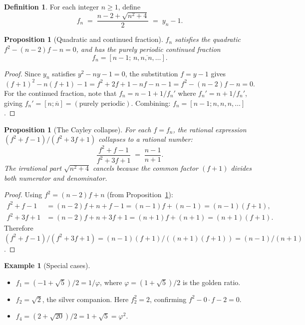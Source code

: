 \documentclass[11pt]{amsart}
\newtheorem{proposition}[theorem]{Proposition}
\theoremstyle{definition}
\newtheorem{definition}[theorem]{Definition}
\newtheorem{example}[theorem]{Example}
\begin{document}
\begin{definition}\label{def:fn}
For each integer $n \geq 1$, define
\[
f_n \;=\; \frac{n - 2 + \sqrt{n^2 + 4}}{2} \;=\; y_n - 1.
\]
\end{definition}

\begin{proposition}[Quadratic and continued fraction]\label{prop:fn-quad}
$f_n$ satisfies the quadratic $f^2 - (n-2)f - n = 0$, and has the purely periodic continued fraction
\[
f_n = [n-1;\, \overline{n, n, n, \ldots}].
\]
\end{proposition}

\begin{proof}
Since $y_n$ satisfies $y^2 - ny - 1 = 0$, the substitution $f = y - 1$ gives
\[
(f+1)^2 - n(f+1) - 1 = f^2 + 2f + 1 - nf - n - 1 = f^2 - (n-2)f - n = 0.
\]
For the continued fraction, note that $f_n = n - 1 + 1/f_n'$ where $f_n' = n + 1/f_n'$, giving $f_n' = [n; \overline{n}] = (\text{purely periodic})$. Combining: $f_n = [n-1; n, n, n, \ldots]$.
\end{proof}

\begin{proposition}[The Cayley collapse]\label{prop:cayley-collapse}
For each $f = f_n$, the rational expression $(f^2 + f - 1)/(f^2 + 3f + 1)$ collapses to a rational number:
\[
\frac{f^2 + f - 1}{f^2 + 3f + 1} \;=\; \frac{n-1}{n+1}.
\]
The irrational part $\sqrt{n^2+4}$ cancels because the common factor $(f+1)$ divides both numerator and denominator.
\end{proposition}

\begin{proof}
Using $f^2 = (n-2)f + n$ (from Proposition~\ref{prop:fn-quad}):
\begin{align*}
f^2 + f - 1 &= (n-2)f + n + f - 1 = (n-1)f + (n-1) = (n-1)(f+1), \\
f^2 + 3f + 1 &= (n-2)f + n + 3f + 1 = (n+1)f + (n+1) = (n+1)(f+1).
\end{align*}
Therefore $(f^2 + f - 1)/(f^2 + 3f + 1) = (n-1)(f+1)/((n+1)(f+1)) = (n-1)/(n+1)$.
\end{proof}

\begin{example}[Special cases]\label{ex:fn-special}
\leavevmode
\begin{itemize}
\item $f_1 = (-1 + \sqrt{5})/2 = 1/\varphi$, where $\varphi = (1+\sqrt{5})/2$ is the golden ratio.
\item $f_2 = \sqrt{2}$, the silver companion. Here $f_2^2 = 2$, confirming $f^2 - 0 \cdot f - 2 = 0$.
\item $f_4 = (2 + \sqrt{20})/2 = 1 + \sqrt{5} = \varphi^2$.
\end{itemize}
\end{example}
\end{document}
